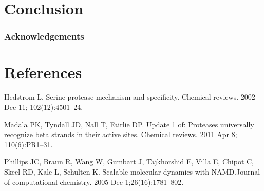 \documentclass[12pt, twocolumn]{article}
\begin{document}
\begin{figure}[H]
    \centering


    \caption{}
\end{figure}


\section{Conclusion}

\subsubsection*{Acknowledgements}

\section{References}
\begin{thebibliography}{9}
Hedstrom L. Serine protease mechanism and specificity.
Chemical reviews. 2002 Dec 11; 102(12):4501--24.

Madala PK, Tyndall JD, Nall T, Fairlie DP.\@
Update 1 of: Proteases universally recognize beta strands in their
active sites. Chemical reviews. 2011 Apr 8; 110(6):PR1--31.

Phillips JC, Braun R, Wang W, Gumbart J, Tajkhorshid E, Villa E,
Chipot C, Skeel RD, Kale L, Schulten K. Scalable molecular dynamics
with NAMD.\@ Journal of computational chemistry. 2005 Dec 1;26(16):1781--802.

\end{thebibliography}
\end{document}
